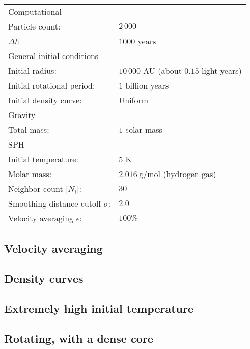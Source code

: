 \documentclass[../main.tex]{subfiles}
\begin{document}
\begin{tabular}{ll}

\multicolumn{2}{l}{Computational} \\
    \qquad Particle count:                     & $2 \, 000$ \\
    \qquad $\Delta t$:                         & $1000$ years \\
\multicolumn{2}{l}{General initial conditions} \\
    \qquad Initial radius:                     & $10 \, 000$ AU (about $0.15$ light years)\\
    \qquad Initial rotational period:          & $1$ billion years \\
    \qquad Initial density curve:              & Uniform \\
\multicolumn{2}{l}{Gravity} \\
    \qquad Total mass:                         & $1$ solar mass \\
\multicolumn{2}{l}{SPH} \\
    \qquad Initial temperature:                & $5$ K \\
    \qquad Molar mass:                         & $\SI{2.016}{\gram\per\mole}$ (hydrogen gas) \\
    \qquad Neighbor count $|N_i|$:             & $30$ \\
    \qquad Smoothing distance cutoff $\sigma$:        & $2.0$ \\
    \qquad Velocity averaging $\epsilon$:      & $100\%$ \\

\end{tabular}


\subsection{Velocity averaging}

\subsection{Density curves}

\subsection{Extremely high initial temperature}

\subsection{Rotating, with a dense core}
\end{document}
